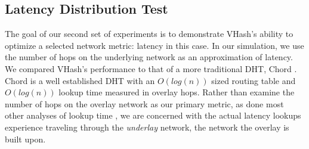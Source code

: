 \documentclass[10pt, conference, letterpaper]{IEEEtran}
\begin{document}






\subsection{Latency Distribution Test}
The goal of our second set of experiments is to demonstrate VHash's ability to optimize a selected network metric: latency in this case. 
In our simulation, we use the number of hops on the underlying network as an approximation of latency.
We compared VHash's performance to that of a more traditional DHT, Chord \cite{chord}.
Chord is a well established DHT with an $O(log(n))$ sized routing table and $O(log(n))$ lookup time measured in overlay hops.  
Rather than examine the number of hops on the overlay network as our primary metric, as done most other analyses of lookup time \cite{chord} \cite{pastry} \cite{raynet}  \cite{kademlia} \cite{voronet}, we are concerned with the actual latency lookups experience traveling through the \emph{underlay} network, the network the overlay is built upon.
\end{document}
